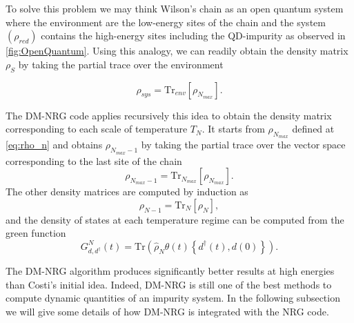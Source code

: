 To solve this problem we may think Wilson's chain as an open quantum system where the environment are the low-energy sites of the chain and the system $(\rho_{red})$ contains the high-energy sites including the QD-impurity  as observed in \ref{fig:OpenQuantum}. Using this analogy,  we can readily obtain the density matrix $\rho_S$ by taking the partial trace over the environment

\begin{equation}
\rho_{sys} = \text{Tr}_{env}[\rho_{N_{max}}].
\end{equation} 

The DM-NRG code applies recursively this idea to obtain the density matrix corresponding to each scale of temperature $T_N$. It starts from $\rho_{N_{max}}$ defined at \eqref{eq:rho_n} and obtains $\rho_{N_{max}-1} $ by taking the partial trace over the vector space corresponding to the last site of the chain
\begin{equation}
\rho_{N_{max}-1} = \text{Tr}_{N_{max}}[\rho_{N_{max}}].
\end{equation}
\noindent The other density matrices are computed by induction as 
\begin{equation}
\rho_{N-1} = \text{Tr}_{N}[\rho_{N}],
\end{equation}
and the density of states at each temperature regime can be computed from the green function 
\begin{equation}
G_{d,d^{\dagger}}^{N} (t) = \text{Tr} \left( \hat{\rho}_{N}\theta(t)\left\{ d^{\dagger}(t),d(0)\right\} \right). 
\end{equation}

The DM-NRG algorithm produces significantly better results  at high energies than Costi's initial idea. Indeed, DM-NRG is still one of the best methods to compute dynamic quantities of an impurity system. In the following subsection we will give some details of how DM-NRG is integrated with the NRG code. 








